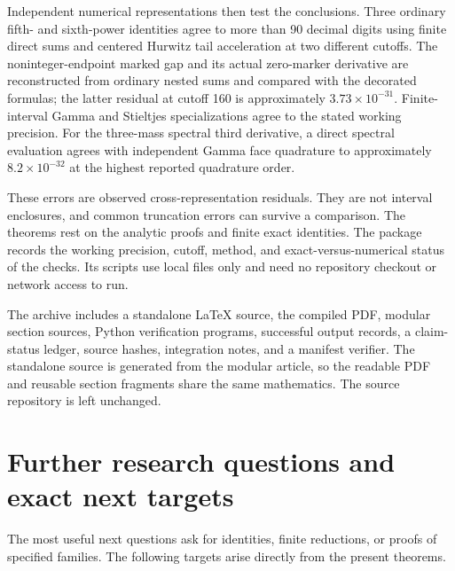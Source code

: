 \documentclass[11pt,a4paper]{article}
\numberwithin{equation}{section}
\theoremstyle{definition}
\theoremstyle{remark}
\begin{document}
Independent numerical representations then test the conclusions.
Three ordinary fifth- and sixth-power identities agree to more than
90 decimal digits using finite direct sums and centered Hurwitz tail
acceleration at two different cutoffs. The noninteger-endpoint marked
gap and its actual zero-marker derivative are reconstructed from
ordinary nested sums and compared with the decorated formulas; the
latter residual at cutoff 160 is approximately $3.73\times10^{-31}$.
Finite-interval Gamma and Stieltjes specializations agree to the stated
working precision. For the three-mass spectral third derivative, a
direct spectral evaluation agrees with independent Gamma face
quadrature to approximately $8.2\times10^{-32}$ at the highest
reported quadrature order.

These errors are observed cross-representation residuals. They are not
interval enclosures, and common truncation errors can survive a
comparison. The theorems rest on the analytic proofs and finite exact
identities. The package records the working precision, cutoff, method,
and exact-versus-numerical status of the checks. Its scripts use local
files only and need no repository checkout or network access to run.

The archive includes a standalone \LaTeX{} source, the compiled PDF,
modular section sources, Python verification programs, successful output
records, a claim-status ledger, source hashes, integration notes, and a
manifest verifier. The standalone source is generated from the modular
article, so the readable PDF and reusable section fragments share the
same mathematics. The source repository is left unchanged.

\section{Further research questions and exact next targets}
\label{sec:research}

The most useful next questions ask for identities, finite reductions,
or proofs of specified families. The following targets arise directly
from the present theorems.
\end{document}
